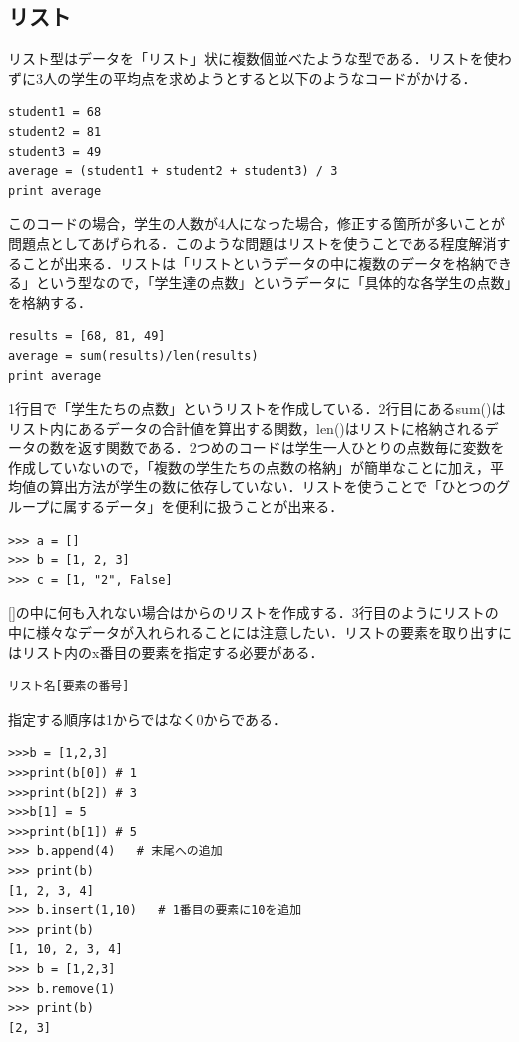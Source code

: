 \documentclass[11pt]{jarticle}
\begin{document}
\subsection{リスト}
リスト型はデータを「リスト」状に複数個並べたような型である．リストを使わずに3人の学生の平均点を求めようとすると以下のようなコードがかける．
\begin{lstlisting}[basicstyle=\ttfamily\footnotesize, frame=single]
student1 = 68
student2 = 81
student3 = 49
average = (student1 + student2 + student3) / 3
print average
 \end{lstlisting}
このコードの場合，学生の人数が4人になった場合，修正する箇所が多いことが問題点としてあげられる．このような問題はリストを使うことである程度解消することが出来る．リストは「リストというデータの中に複数のデータを格納できる」という型なので，「学生達の点数」というデータに「具体的な各学生の点数」を格納する．
\begin{lstlisting}[basicstyle=\ttfamily\footnotesize, frame=single]
results = [68, 81, 49]
average = sum(results)/len(results)
print average
\end{lstlisting}
1行目で「学生たちの点数」というリストを作成している．2行目にあるsum()はリスト内にあるデータの合計値を算出する関数，len()はリストに格納されるデータの数を返す関数である．2つめのコードは学生一人ひとりの点数毎に変数を作成していないので，「複数の学生たちの点数の格納」が簡単なことに加え，平均値の算出方法が学生の数に依存していない．リストを使うことで「ひとつのグループに属するデータ」を便利に扱うことが出来る．
\begin{lstlisting}[basicstyle=\ttfamily\footnotesize, frame=single]
>>> a = []
>>> b = [1, 2, 3]
>>> c = [1, "2", False]
\end{lstlisting}
[]の中に何も入れない場合はからのリストを作成する．3行目のようにリストの中に様々なデータが入れられることには注意したい．リストの要素を取り出すにはリスト内のx番目の要素を指定する必要がある．
\begin{lstlisting}[basicstyle=\ttfamily\footnotesize, frame=single]
リスト名[要素の番号]
\end{lstlisting}
指定する順序は1からではなく0からである．
\begin{lstlisting}[basicstyle=\ttfamily\footnotesize, frame=single]
>>>b = [1,2,3]
>>>print(b[0]) # 1
>>>print(b[2]) # 3
>>>b[1] = 5
>>>print(b[1]) # 5
>>> b.append(4)   # 末尾への追加
>>> print(b)
[1, 2, 3, 4]
>>> b.insert(1,10)   # 1番目の要素に10を追加
>>> print(b)
[1, 10, 2, 3, 4]
>>> b = [1,2,3]
>>> b.remove(1)
>>> print(b)
[2, 3]
\end{lstlisting}
\end{document}
